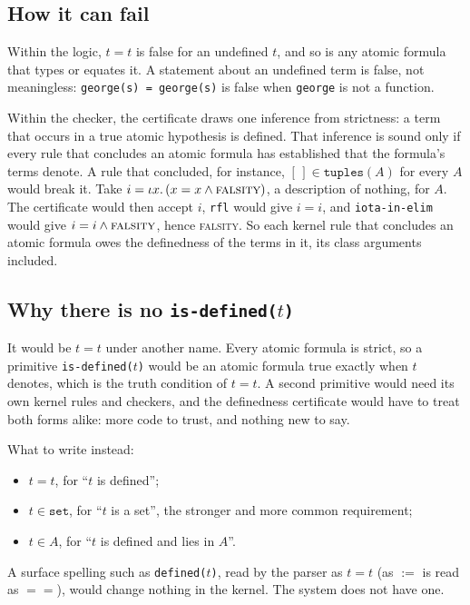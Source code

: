 \subsection{How it can fail}

Within the logic, $t = t$ is false for an undefined $t$, and so is any
atomic formula that types or equates it.  A statement about an undefined
term is false, not meaningless: \texttt{george(s) = george(s)} is false
when \texttt{george} is not a function.

Within the checker, the certificate draws one inference from
strictness: a term that occurs in a true atomic hypothesis is defined.
That inference is sound only if every rule that concludes an atomic
formula has established that the formula's terms denote.  A rule that
concluded, for instance, $[\,] \in \mathtt{tuples}(A)$ for every $A$
would break it.  Take $i = \iota x.\,(x = x \wedge \textsc{falsity})$,
a description of nothing, for $A$.  The certificate would then accept
$i$, \texttt{rfl} would give $i = i$, and \texttt{iota-in-elim} would
give $i = i \wedge \textsc{falsity}$, hence \textsc{falsity}.  So each
kernel rule that concludes an atomic formula owes the definedness of
the terms in it, its class arguments included.

\subsection{Why there is no \texttt{is-defined($t$)}}

It would be $t = t$ under another name.  Every atomic formula is strict,
so a primitive \texttt{is-defined($t$)} would be an atomic formula true
exactly when $t$ denotes, which is the truth condition of $t = t$.  A
second primitive would need its own kernel rules and checkers, and the
definedness certificate would have to treat both forms alike: more code
to trust, and nothing new to say.

What to write instead:
\begin{itemize}
\item $t = t$, for ``$t$ is defined'';
\item $t \in \mathtt{set}$, for ``$t$ is a set'', the stronger and more
  common requirement;
\item $t \in A$, for ``$t$ is defined and lies in $A$''.
\end{itemize}
A surface spelling such as \texttt{defined($t$)}, read by the parser as
$t = t$ (as $:=$ is read as $==$), would change nothing in the kernel.
The system does not have one.


